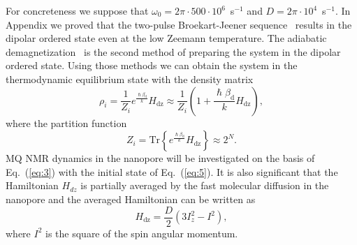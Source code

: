 \documentclass[review]{elsarticle}
\begin{document}
For concreteness we suppose that $\omega_{0} = 2\pi \cdot 500 \cdot 10^{6}$~s$^{-1}$ and $D = 2\pi \cdot 10^{4}$~s$^{-1}$.
In Appendix we proved that the two-pulse Broekart-Jeener sequence~\cite{Goldman_1970,Jeener_1967} results in the dipolar ordered state even at the low Zeemann temperature.
The adiabatic demagnetization~\cite{Goldman_1970,Slichter_1961} is the second method of preparing the system in the dipolar ordered state.
Using those methods we can obtain the system in the thermodynamic equilibrium state with the density matrix
%
\begin{equation}
    \label{eq:5}
    \rho_i = \frac{1}{Z_i} e^\frac{\hslash\beta_\mathrm{d}}{k}H_\mathrm{dz}
    \approx \frac{1}{Z_i}(1 + \frac{\hslash\beta_\mathrm{d}}{k} H_\mathrm{dz}),
\end{equation}
%
where the partition function
%
\begin{equation}
    \label{eq:6}
    Z_i = \mathrm{Tr} \left\{ e^\frac{\hslash\beta_\mathrm{d}}{k} H_\mathrm{dz}\right\} \approx 2^{N}.
\end{equation}
%
MQ NMR dynamics in the nanopore will be investigated on the basis of Eq.~(\ref{eq:3}) with the initial state of Eq.~(\ref{eq:5}).
It is also significant that the Hamiltonian $H_{dz}$ is partially averaged by the fast molecular diffusion in the nanopore and the averaged Hamiltonian can be written as \cite{Fel_dman_2004,Doronin_2011}
%
\begin{equation}
    \label{eq:7}
    H_\mathrm{dz} = \dfrac{D}{2} (3 I^{2}_{z} - I^{2}) , %
\end{equation}
%
where $I^{2}$ is the square of the spin angular momentum.
\end{document}
